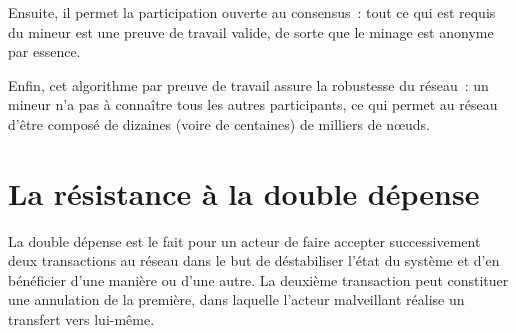 Ensuite, il permet la participation ouverte au consensus~: tout ce qui est requis du mineur est une preuve de travail valide, de sorte que le minage est anonyme par essence.

Enfin, cet algorithme par preuve de travail assure la robustesse du réseau~: un mineur n'a pas à connaître tous les autres participants, ce qui permet au réseau d'être composé de dizaines (voire de centaines) de milliers de nœuds.

\section*{La résistance à la double dépense}

La double dépense est le fait pour un acteur de faire accepter successivement deux transactions au réseau dans le but de déstabiliser l'état du système et d'en bénéficier d'une manière ou d'une autre. La deuxième transaction peut constituer une annulation de la première, dans laquelle l'acteur malveillant réalise un transfert vers lui-même.

